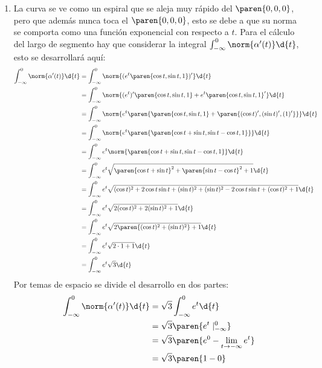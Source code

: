 \documentclass{homework}
\begin{document}
\begin{sol}
    \begin{enumerate}
        \item La curva se ve como un espiral que se aleja muy rápido del \(\paren{0,0,0}\), pero que además nunca toca el \(\paren{0,0,0}\), esto se debe a que su norma se comporta como una función exponencial con respecto a \(t\). Para el cálculo del largo de segmento hay que considerar la integral \(\int_{-\infty}^0\norm{\alpha'(t)}\d{t}\), esto se desarrollará aquí:
        \begin{align*}
            \int_{-\infty}^0\norm{\alpha'(t)}\d{t}&=\int_{-\infty}^0\norm{(e^t\paren{\cos t,\sin t, 1})'}\d{t}\\
            &=\int_{-\infty}^0\norm{(e^t)'\paren{\cos t,\sin t, 1}+e^t\paren{\cos t, \sin t, 1}'}\d{t}\\
            &=\int_{-\infty}^0\norm{e^t\paren{\paren{\cos t,\sin t, 1}+\paren{(\cos t)', (\sin t)', (1)'}}}\d{t}\\
            &=\int_{-\infty}^0\norm{e^t\paren{\paren{\cos t+\sin t,\sin t-\cos t, 1}}}\d{t}\\
            &=\int_{-\infty}^0e^t\norm{\paren{\cos t+\sin t,\sin t-\cos t, 1}}\d{t}\\
            &=\int_{-\infty}^0e^t\sqrt{\paren{\cos t+\sin t}^2+\paren{\sin t-\cos t}^2+1}\d{t}\\
            &=\int_{-\infty}^0e^t\sqrt{(\cos t)^2+2\cos t\sin t+(\sin t)^2+(\sin t)^2-2\cos t\sin t+(\cos t)^2+1}\d{t}\\
            &=\int_{-\infty}^0e^t\sqrt{2(\cos t)^2+2(\sin t)^2+1}\d{t}\\
            &=\int_{-\infty}^0e^t\sqrt{2\paren{(\cos t)^2+(\sin t)^2}+1}\d{t}\\
            &=\int_{-\infty}^0e^t\sqrt{2\cdot 1+1}\d{t}\\
            &=\int_{-\infty}^0e^t\sqrt{3}\d{t}\\
        \end{align*}
            Por temas de espacio se divide el desarrollo en dos partes:
        \begin{align*}
            \int_{-\infty}^0\norm{\alpha'(t)}\d{t}
            &=\sqrt{3}\int_{-\infty}^0e^t\d{t}\\
            &=\sqrt{3}\paren{e^t\mid_{-\infty}^0}\\
            &=\sqrt{3}\paren{e^0-\lim_{t\rightarrow -\infty}e^t}\\
            &=\sqrt{3}\paren{1-0}\\

\end{align*}
\end{enumerate}
\end{sol}
\end{document}
